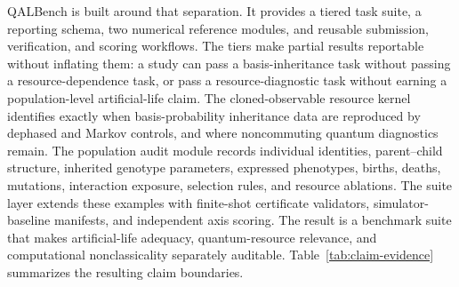 \documentclass[11pt]{article}
\begin{document}
QALBench is built around that separation. It provides a tiered task suite, a reporting schema, two numerical reference modules, and reusable submission, verification, and scoring workflows. The tiers make partial results reportable without inflating them: a study can pass a basis-inheritance task without passing a resource-dependence task, or pass a resource-diagnostic task without earning a population-level artificial-life claim. The cloned-observable resource kernel identifies exactly when basis-probability inheritance data are reproduced by dephased and Markov controls, and where noncommuting quantum diagnostics remain. The population audit module records individual identities, parent--child structure, inherited genotype parameters, expressed phenotypes, births, deaths, mutations, interaction exposure, selection rules, and resource ablations. The suite layer extends these examples with finite-shot certificate validators, simulator-baseline manifests, and independent axis scoring. The result is a benchmark suite that makes artificial-life adequacy, quantum-resource relevance, and computational nonclassicality separately auditable. Table~\ref{tab:claim-evidence} summarizes the resulting claim boundaries.
\end{document}
